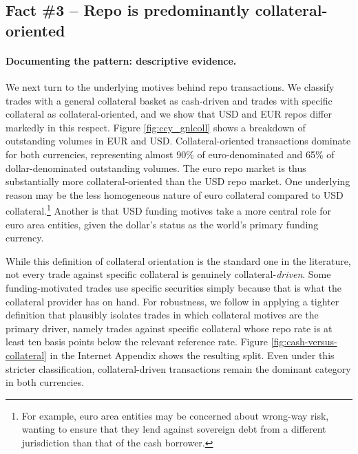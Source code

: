 \documentclass[english, 12pt, oneside]{article}
\begin{document}
\subsection[Fact \#3 -- Repo is predominantly collateral-oriented]{Fact \#3 -- Repo is predominantly collateral-oriented}%
\label{sec:fact3}

\paragraph{Documenting the pattern: descriptive evidence.}

We next turn to the underlying motives behind repo transactions. We classify trades with a general collateral basket as cash-driven and trades with specific collateral as collateral-oriented, and we show that USD and EUR repos differ markedly in this respect. Figure \ref{fig:ccy_gnlcoll} shows a breakdown of outstanding volumes in EUR and USD. Collateral-oriented transactions dominate for both currencies, representing almost 90\% of euro-denominated and 65\% of dollar-denominated outstanding volumes. The euro repo market is thus substantially more collateral-oriented than the USD repo market. One underlying reason may be the less homogeneous nature of euro collateral compared to USD collateral.\footnote{For example, euro area entities may be concerned about wrong-way risk, wanting to ensure that they lend against sovereign debt from a different jurisdiction than that of the cash borrower.} Another is that USD funding motives take a more central role for euro area entities, given the dollar's status as the world's primary funding currency.

While this definition of collateral orientation is the standard one in the literature, not every trade against specific collateral is genuinely collateral-\emph{driven}. Some funding-motivated trades use specific securities simply because that is what the collateral provider has on hand. For robustness, we follow \citet{hermes2025} in applying a tighter definition that plausibly isolates trades in which collateral motives are the primary driver, namely trades against specific collateral whose repo rate is at least ten basis points below the relevant reference rate. Figure \ref{fig:cash-versus-collateral} in the Internet Appendix shows the resulting split. Even under this stricter classification, collateral-driven transactions remain the dominant category in both currencies.
\end{document}

